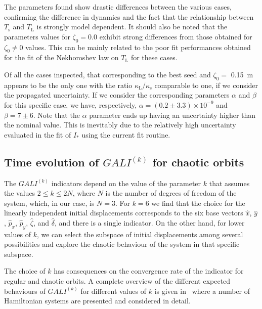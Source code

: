 The parameters found show drastic differences between the various cases, confirming the difference in dynamics and the fact that the relationship between $T_\mathrm{s}$ and $T_\mathrm{L}$ is strongly model dependent. It should also be noted that the parameters values for $\zeta_0=0.0$ exhibit strong differences from those obtained for $\zeta_0 \neq 0$ values. This can be mainly related to the poor fit performances obtained for the fit of the Nekhoroshev law on $T_\mathrm{L}$ for these cases.

Of all the cases inspected, that corresponding to the best seed and $\zeta_0 =$ \SI{0.15}{\meter} appears to be the only one with the ratio $\kappa_\mathrm{L}/\kappa_{\mathrm{s}}$ comparable to one, if we consider the propagated uncertainty. If we consider the corresponding parameters $\alpha$ and $\beta$ for this specific case, we have, respectively, $\alpha = (0.2\pm3.3)\times10^{-9}$ and $\beta = 7\pm6$. Note that the $\alpha$ parameter ends up having an uncertainty higher than the nominal value. This is inevitably due to the relatively high uncertainty evaluated in the fit of $I_\ast$ using the current fit routine. %

\subsection{Time evolution of $GALI^{(k)}$ for chaotic orbits}

The $GALI^{(k)}$ indicators depend on the value of the parameter $k$ that assumes the values $2 \leq k \leq 2N$, where $N$ is the number of degrees of freedom of the system, which, in our case, is $N=3$. For $k=6$ we find that the choice for the linearly independent initial displacements corresponds to the six base vectors $\hat{x}$, $\hat{y}$, $\hat{p}_x$, $\hat{p}_y$, $\hat{\zeta}$, and $\hat{\delta}$, and there is a single indicator. On the other hand, for lower values of $k$, we can select the subspace of initial displacements among several possibilities and explore the chaotic behaviour of the system in that specific subspace.

The choice of $k$ has consequences on the convergence rate of the indicator for regular and chaotic orbits. A complete overview of the different expected behaviours of $GALI^{(k)}$ for different values of $k$ is given in~\cite{SKOKOS200730} where a number of Hamiltonian systems are presented and considered in detail.

